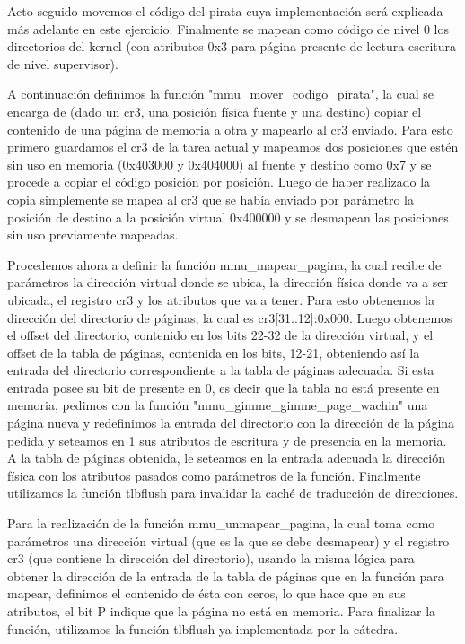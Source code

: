 \documentclass[a4paper]{article}
\begin{document}
Acto seguido movemos el código del pirata cuya implementación será explicada más adelante en este ejercicio. Finalmente se mapean como código de nivel 0 los directorios del kernel (con atributos 0x3 para página presente de lectura escritura de nivel supervisor).

A continuación definimos la función "mmu_mover_codigo_pirata", la cual se encarga de (dado un cr3, una posición física fuente y una destino) copiar el contenido de una página de memoria a otra y mapearlo al cr3 enviado. Para esto primero guardamos el cr3 de la tarea actual y mapeamos dos posiciones que estén sin uso en memoria (0x403000 y 0x404000) al fuente y destino como 0x7 y se procede a copiar el código posición por posición. Luego de haber realizado la copia simplemente se mapea al cr3 que se había enviado por parámetro la posición de destino a la posición virtual 0x400000 y se desmapean las posiciones sin uso previamente mapeadas.

Procedemos ahora a definir la función mmu_mapear_pagina, la cual recibe de parámetros la dirección virtual donde se ubica, la dirección física donde va a ser ubicada, el registro cr3 y los atributos que va a tener. Para esto obtenemos la dirección del directorio de páginas, la cual es cr3[31..12]:0x000. Luego obtenemos el offset del directorio, contenido en los bits 22-32 de la dirección virtual, y el offset de la tabla de páginas, contenida en los bits, 12-21, obteniendo así la entrada del directorio correspondiente a la tabla de páginas adecuada. Si esta entrada posee su bit de presente en 0, es decir que la tabla no está presente en memoria, pedimos con la función "mmu_gimme_gimme_page_wachin" una página nueva y redefinimos la entrada del directorio con la dirección de la página pedida y seteamos en 1 sus atributos de escritura y de presencia en la memoria. A la tabla de páginas obtenida, le seteamos en la entrada adecuada la dirección física con los atributos pasados como parámetros de la función. Finalmente utilizamos la función tlbflush para invalidar la caché de traducción de direcciones.

Para la realización de la función mmu_unmapear_pagina, la cual toma como parámetros una dirección virtual (que es la que se debe desmapear) y el registro cr3 (que contiene la dirección del directorio), usando la misma lógica para obtener la dirección de la entrada de la tabla de páginas que en la función para mapear, definimos el contenido de ésta con ceros, lo que hace que en sus atributos, el bit P indique que la página no está en memoria. Para finalizar la función, utilizamos la función tlbflush ya implementada por la cátedra.
\end{document}

